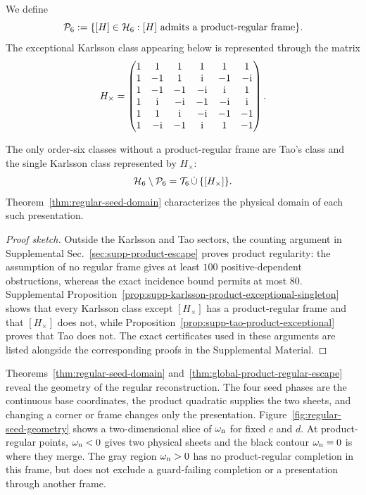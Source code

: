 We define
\begin{equation}
\mathcal P_6:=\{[H]\in\mathcal H_6:\text{$[H]$ admits a product-regular frame}\}.
\label{eq:main-product-regular-class-locus}
\end{equation}
The exceptional Karlsson class appearing below is represented through the matrix
\begin{equation}
H_\times=
\begin{pmatrix}
1&1&1&1&1&1\\
1&-1&1&\mathrm i&-1&-\mathrm i\\
1&-1&-1&-\mathrm i&\mathrm i&1\\
1&\mathrm i&-\mathrm i&-1&-\mathrm i&\mathrm i\\
1&1&\mathrm i&-\mathrm i&-1&-1\\
1&-\mathrm i&-1&\mathrm i&1&-1
\end{pmatrix}.
\label{eq:main-product-exceptional-karlsson-matrix}
\end{equation}

\begin{theorem}
\label{thm:atlas-main}
\label{thm:global-product-regular-escape}
The only order-six classes without a product-regular frame are Tao's class
and the single Karlsson class represented by $H_\times$:
\begin{equation}
\mathcal H_6\setminus\mathcal P_6
=\mathcal T_6\,\dot\cup\,\{[H_\times]\}.
\label{eq:global-product-regular-reach}
\end{equation}
Theorem~\ref{thm:regular-seed-domain} characterizes the physical domain of
each such presentation.
\end{theorem}

\begin{proof}[Proof sketch]
Outside the Karlsson and Tao sectors, the counting argument in Supplemental
Sec.~\ref{sec:supp-product-escape} proves product regularity: the assumption
of no regular frame gives at least $100$ positive-dependent obstructions,
whereas the exact incidence bound permits at most $80$.
Supplemental Proposition~\ref{prop:supp-karlsson-product-exceptional-singleton}
shows that every Karlsson class except $[H_\times]$ has a product-regular
frame and that $[H_\times]$ does not, while
Proposition~\ref{prop:supp-tao-product-exceptional} proves that Tao does not.
The exact certificates used in these arguments are listed alongside the
corresponding proofs in the Supplemental Material.
\end{proof}

Theorems~\ref{thm:regular-seed-domain} and~\ref{thm:global-product-regular-escape} reveal the geometry of the regular reconstruction. The four seed phases are the continuous base coordinates, the product quadratic supplies the two sheets, and changing a corner or frame changes only the presentation. Figure~\ref{fig:regular-seed-geometry} shows a two-dimensional slice of $\omega_{\rm n}$ for fixed $c$ and $d$. At product-regular points, $\omega_{\rm n}<0$ gives two physical sheets and the black contour $\omega_{\rm n}=0$ is where they merge. The gray region $\omega_{\rm n}>0$ has no product-regular completion in this frame, but does not exclude a guard-failing completion or a presentation through another frame.

